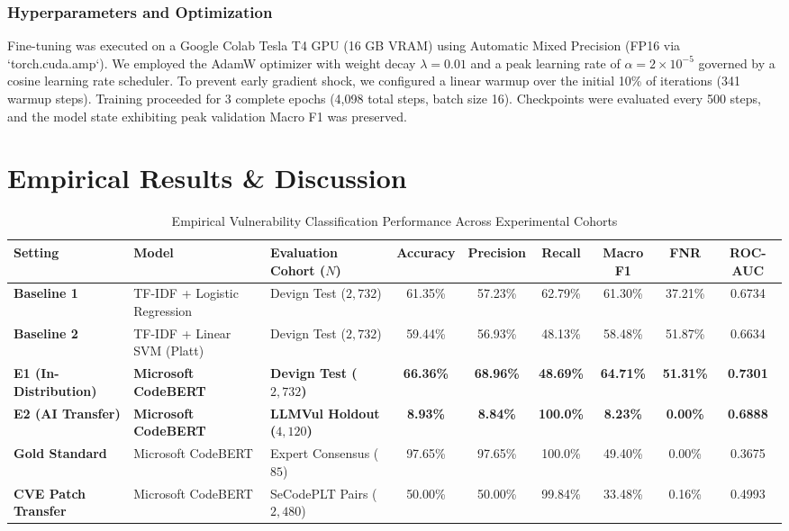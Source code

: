 \documentclass[conference]{IEEEtran}
\begin{document}
\subsubsection{Hyperparameters and Optimization}
Fine-tuning was executed on a Google Colab Tesla T4 GPU (16 GB VRAM) using Automatic Mixed Precision (FP16 via `torch.cuda.amp`). We employed the AdamW optimizer with weight decay $\lambda = 0.01$ and a peak learning rate of $\alpha = 2 \times 10^{-5}$ governed by a cosine learning rate scheduler. To prevent early gradient shock, we configured a linear warmup over the initial 10\% of iterations (341 warmup steps). Training proceeded for 3 complete epochs (4,098 total steps, batch size 16). Checkpoints were evaluated every 500 steps, and the model state exhibiting peak validation Macro F1 was preserved.

\section{Empirical Results \& Discussion}

\begin{table}[t]
\centering
\caption{Empirical Vulnerability Classification Performance Across Experimental Cohorts}
\label{tab:main_results}
\begin{tabular}{@{}lllcccccc@{}}
\toprule
\textbf{Setting} & \textbf{Model} & \textbf{Evaluation Cohort ($N$)} & \textbf{Accuracy} & \textbf{Precision} & \textbf{Recall} & \textbf{Macro F1} & \textbf{FNR} & \textbf{ROC-AUC} \\
\midrule
\textbf{Baseline 1} & TF-IDF + Logistic Regression & Devign Test ($2,732$) & 61.35\% & 57.23\% & 62.79\% & 61.30\% & 37.21\% & 0.6734 \\
\textbf{Baseline 2} & TF-IDF + Linear SVM (Platt) & Devign Test ($2,732$) & 59.44\% & 56.93\% & 48.13\% & 58.48\% & 51.87\% & 0.6634 \\
\textbf{E1 (In-Distribution)} & \textbf{Microsoft CodeBERT} & \textbf{Devign Test ($2,732$)} & \textbf{66.36\%} & \textbf{68.96\%} & \textbf{48.69\%} & \textbf{64.71\%} & \textbf{51.31\%} & \textbf{0.7301} \\
\midrule
\textbf{E2 (AI Transfer)} & \textbf{Microsoft CodeBERT} & \textbf{LLMVul Holdout ($4,120$)} & \textbf{8.93\%} & \textbf{8.84\%} & \textbf{100.0\%} & \textbf{8.23\%} & \textbf{0.00\%} & \textbf{0.6888} \\
\textbf{Gold Standard} & Microsoft CodeBERT & Expert Consensus ($85$) & 97.65\% & 97.65\% & 100.0\% & 49.40\% & 0.00\% & 0.3675 \\
\textbf{CVE Patch Transfer} & Microsoft CodeBERT & SeCodePLT Pairs ($2,480$) & 50.00\% & 50.00\% & 99.84\% & 33.48\% & 0.16\% & 0.4993 \\
\bottomrule
\end{tabular}
\end{table}
\end{document}
